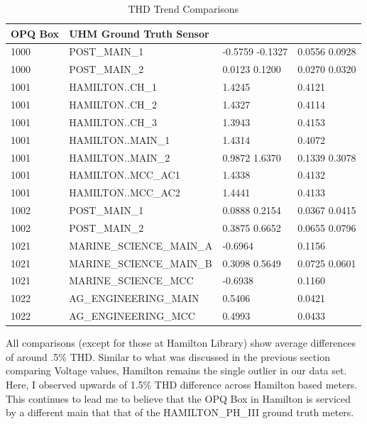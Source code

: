 \begin{table}[h]
    \centering
    \caption{THD Trend Comparisons}
    \begin{tabularx}{\textwidth}{lXll}
        \toprule
        \textbf{OPQ Box} & \textbf{UHM Ground Truth Sensor} & \boldmath{$\mu$} & \boldmath{$\sigma$} \\
        \midrule
        1000 & POST\_MAIN\_1 & -0.5759 -0.1327 & 0.0556 0.0928 \\
        1000 & POST\_MAIN\_2 & 0.0123 0.1200 & 0.0270 0.0320 \\
        1001 & HAMILTON..CH\_1 & 1.4245 & 0.4121 \\
        1001 & HAMILTON..CH\_2 & 1.4327 & 0.4114 \\
        1001 & HAMILTON..CH\_3 & 1.3943 & 0.4153 \\
        1001 & HAMILTON..MAIN\_1 & 1.4314 & 0.4072 \\
        1001 & HAMILTON..MAIN\_2 & 0.9872 1.6370 & 0.1339 0.3078 \\
        1001 & HAMILTON..MCC\_AC1 & 1.4338 & 0.4132 \\
        1001 & HAMILTON..MCC\_AC2 & 1.4441 & 0.4133 \\
        1002 & POST\_MAIN\_1 & 0.0888 0.2154 & 0.0367 0.0415 \\
        1002 & POST\_MAIN\_2 & 0.3875 0.6652 & 0.0655 0.0796 \\
        1021 & MARINE\_SCIENCE\_MAIN\_A & -0.6964 & 0.1156 \\
        1021 & MARINE\_SCIENCE\_MAIN\_B & 0.3098 0.5649 & 0.0725 0.0601 \\
        1021 & MARINE\_SCIENCE\_MCC & -0.6938 & 0.1160 \\
        1022 & AG\_ENGINEERING\_MAIN & 0.5406 & 0.0421 \\
        1022 & AG\_ENGINEERING\_MCC & 0.4993 & 0.0433 \\
        \bottomrule
    \end{tabularx}
    \label{table:gt_thd}
\end{table}

All comparisons (except for those at Hamilton Library) show average differences of around .5\% THD. Similar to what was discussed in the previous section comparing Voltage values, Hamilton remains the single outlier in our data set. Here, I observed upwards of 1.5\% THD difference across Hamilton based meters. This continues to lead me to believe that the OPQ Box in Hamilton is serviced by a different main that that of the HAMILTON\_PH\_III ground truth meters.


